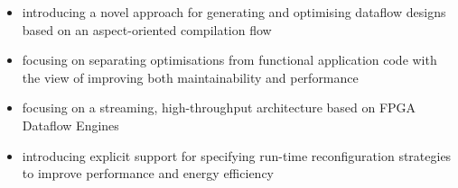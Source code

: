 \begin{itemize}
\item introducing a novel approach for generating and optimising
  dataflow designs based on an aspect-oriented compilation flow
\item focusing on separating optimisations from functional application
  code with the view of improving both maintainability and performance
\item focusing on a streaming, high-throughput architecture based on
  FPGA Dataflow Engines
\item introducing explicit support for specifying run-time
  reconfiguration strategies to improve performance and energy
  efficiency
\end{itemize}